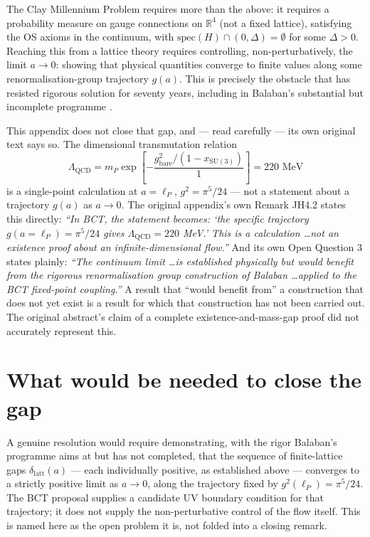 \documentclass[twocolumn,10pt,a4paper]{article}
\begin{document}
The Clay Millennium Problem requires more than the above: it requires a
probability measure on gauge connections on $\mathbb R^4$ (not a fixed
lattice), satisfying the OS axioms in the continuum, with
$\mathrm{spec}(H)\cap(0,\Delta)=\emptyset$ for some $\Delta>0$. Reaching this
from a lattice theory requires controlling, non-perturbatively, the limit
$a\to0$: showing that physical quantities converge to finite values along
some renormalisation-group trajectory $g(a)$. This is precisely the
obstacle that has resisted rigorous solution for seventy years, including in
Balaban's substantial but incomplete programme \cite{balaban1988,balaban1989}.

This appendix does not close that gap, and --- read carefully --- its own
original text says so. The dimensional transmutation relation
\begin{equation}
\Lambda_{\mathrm{QCD}} = m_P \exp\!\left[-\frac{g^2_{\mathrm{bare}}/(1-x_{\mathrm{SU(3)}})}{1}\right] = 220\text{ MeV}
\end{equation}
is a single-point calculation at $a=\ell_P$, $g^2=\pi^5/24$ --- not a
statement about a trajectory $g(a)$ as $a\to0$. The original appendix's own
Remark JH4.2 states this directly: \emph{``In BCT, the statement becomes:
`the specific trajectory $g(a=\ell_P)=\pi^5/24$ gives $\Lambda_{\mathrm{QCD}}=220$
MeV.' This is a calculation \ldots not an existence proof about an
infinite-dimensional flow.''} And its own Open Question 3 states plainly:
\emph{``The continuum limit \ldots is established physically but would
benefit from the rigorous renormalisation group construction of Balaban
\ldots applied to the BCT fixed-point coupling.''} A result that ``would
benefit from'' a construction that does not yet exist is a result for which
that construction has not been carried out. The original abstract's claim
of a complete existence-and-mass-gap proof did not accurately represent
this.

\section{What would be needed to close the gap}

A genuine resolution would require demonstrating, with the rigor Balaban's
programme aims at but has not completed, that the sequence of finite-lattice
gaps $\delta_{\mathrm{latt}}(a)$ --- each individually positive, as
established above --- converges to a strictly positive limit as $a\to0$,
along the trajectory fixed by $g^2(\ell_P)=\pi^5/24$. The BCT proposal
supplies a candidate UV boundary condition for that trajectory; it does not
supply the non-perturbative control of the flow itself. This is named here
as the open problem it is, not folded into a closing remark.
\end{document}
